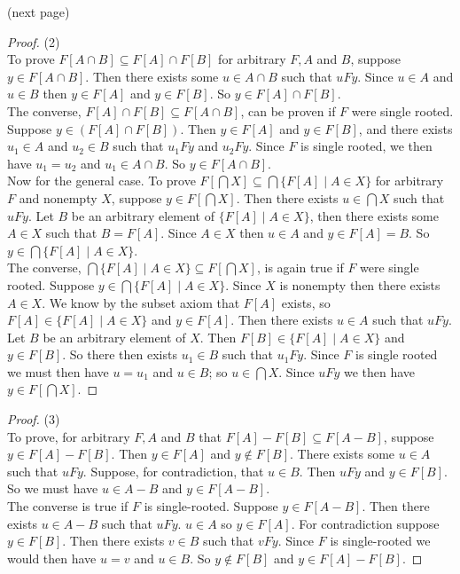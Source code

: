 \documentclass{report}
\begin{document}
\noindent(next page)\newpage
\begin{proof}(2)\\
\indent To prove $F[A\cap B]\subseteq F[A]\cap F[B]$ for arbitrary $F,A$ and $B$, suppose $y\in F[A\cap B]$. Then there exists some $u\in A\cap B$ such that $uFy$. Since $u\in A$ and $u\in B$ then 
$y\in F[A]$ and $y\in F[B]$. So $y\in F[A]\cap F[B]$.\\
\indent The converse, $F[A]\cap F[B]\subseteq F[A\cap B]$, can be proven if $F$ were single rooted.
Suppose $y\in(F[A]\cap F[B])$. Then $y\in F[A]$ and $y\in F[B]$, and there exists $u_1\in A$ and $u_2\in B$ such that $u_1Fy$ and $u_2Fy$.
Since $F$ is single rooted, we then have $u_1=u_2$ and $u_1\in A\cap B$. So $y\in F[A\cap B]$.\\
\indent Now for the general case. To prove $F[\bigcap X]\subseteq\bigcap\{F[A]\mid A\in X\}$ for arbitrary $F$ and nonempty $X$, suppose $y\in F[\bigcap X]$. Then there exists $u\in\bigcap X$
such that $uFy$. Let $B$ be an arbitrary element of $\{F[A]\mid A\in X\}$, then there exists some $A\in X$ such that $B=F[A]$. Since $A\in X$ then $u\in A$ and $y\in F[A]=B$. 
So $y\in\bigcap\{F[A]\mid A\in X\}$.\\
\indent The converse, $\bigcap\{F[A]\mid A\in X\}\subseteq F[\bigcap X]$, is again true if $F$ were single rooted. Suppose $y\in\bigcap\{F[A]\mid A\in X\}$. Since $X$ is nonempty then there
exists $A\in X$. We know by the subset axiom that $F[A]$ exists, so $F[A]\in\{F[A]\mid A\in X\}$ and $y\in F[A]$. Then there exists $u\in A$ such that $uFy$. 
Let $B$ be an arbitrary element of $X$. Then $F[B]\in\{F[A]\mid A\in X\}$ and $y\in F[B]$. So there
then exists $u_1\in B$ such that $u_1Fy$. Since $F$ is single rooted we must then have $u=u_1$ and 
$u\in B$; so $u\in\bigcap X$. Since $uFy$ we then have $y\in F[\bigcap X]$.
\end{proof}
\begin{proof}(3)\\
\indent To prove, for arbitrary $F,A$ and $B$ that $F[A]-F[B]\subseteq F[A-B]$, suppose $y\in F[A]-F[B]$. Then $y\in F[A]$ and $y\notin F[B]$. There exists some $u\in A$ such that $uFy$.
Suppose, for contradiction, that $u\in B$. Then $uFy$ and $y\in F[B]$. So we must have
$u\in A-B$ and $y\in F[A-B]$.\\
\indent The converse is true if $F$ is single-rooted. Suppose $y\in F[A-B]$. Then there exists $u\in A-B$ such that $uFy$. $u\in A$ so $y\in F[A]$. For contradiction suppose $y\in F[B]$. Then there
exists $v\in B$ such that $vFy$. Since $F$ is single-rooted we would then have $u=v$ and $u\in B$.
So $y\notin F[B]$ and $y\in F[A]-F[B]$.
\end{proof}
\end{document}

